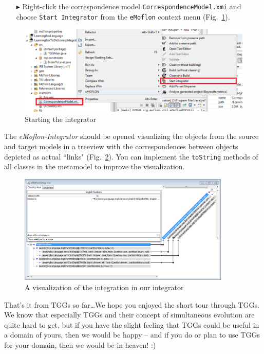\begin{enumerate}
\item[$\blacktriangleright$] Right-click the correspondence model \texttt{Correspondence\-Model\-.xmi} and choose \texttt{Start Integrator} from the \texttt{eMoflon} context menu (Fig.~\ref{fig:startintegrator}).
\end{enumerate}

\begin{figure}[htbp]
\begin{center}
  \includegraphics[width=\textwidth]{pics/tggBilder/transformation/tgg29}
  \caption{Starting the integrator}  
  \label{fig:startintegrator}
\end{center}
\end{figure} 

The \emph{eMoflon-Integrator} should be opened visualizing the objects from the source and target models in a treeview with the correspondences between objects depicted as actual ``links" (Fig.~\ref{fig:emoflonintegrator}).
You can implement the \texttt{toString} methods of all classes in the metamodel to improve the visualization.

\begin{figure}[htbp]
\begin{center}
  \includegraphics[width=0.9\textwidth]{pics/tggBilder/transformation/tgg30}
  \caption{A visualization of the integration in our integrator}  
  \label{fig:emoflonintegrator}
\end{center}
\end{figure} 

That's it from TGGs so far\ldots We hope you enjoyed the short tour through TGGs. We know that especially TGGs and their concept of simultaneous evolution are quite hard to get, but if you have the slight feeling that TGGs could be useful in a domain of yours, then we would be happy -- and if you do or plan to use TGGs for your domain, then we would be in heaven! :)